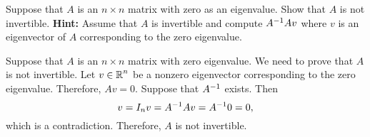 \documentclass{ximera}
\begin{document}
\begin{exercise}  \label{c4.9.6A}
Suppose that $A$ is an $n\times n$ matrix with zero as an eigenvalue.
Show that $A$ is not invertible.  {\bf Hint:}  Assume that $A$ is invertible 
and compute $A^{-1} Av$ where $v$ is an eigenvector of $A$ corresponding to 
the zero eigenvalue.

\begin{solution}
\soln
Suppose that $A$ is an $n\times n$ matrix with zero eigenvalue.  We need to
prove that $A$ is not invertible.  Let $v\in\mbox{$\Bbb{R}$}^n$ be a nonzero 
eigenvector corresponding to the zero eigenvalue.  Therefore, $Av=0$. 
Suppose that $A^{-1}$ exists.  Then
\[
v = I_nv = A^{-1} Av = A^{-1} 0 = 0,
\]
which is a contradiction.  Therefore, $A$ is not invertible.

\end{solution}
\end{exercise}
\end{document}
